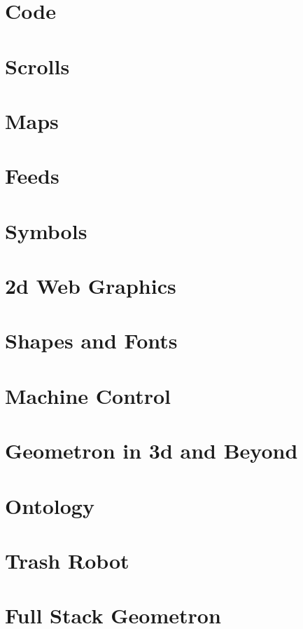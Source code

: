\documentclass[ebook,12pt,openany]{memoir} %
\begin{document}
\chapter{Code}

\chapter{Scrolls}

\chapter{Maps}

\chapter{Feeds}

\chapter{Symbols}

\chapter{2d Web Graphics}

\chapter{Shapes and Fonts}

\chapter{Machine Control}

\chapter{Geometron in 3d and Beyond}

\chapter{Ontology}

\chapter{Trash Robot}

\chapter{Full Stack Geometron}



\end{document}
